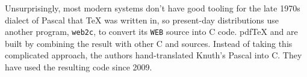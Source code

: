 Unsurprisingly, most modern systems don't have good tooling for the late 1970s
dialect of Pascal that \TeX{} was written in,
so present-day distributions use another program,
\texttt{web2c}, to convert its \texttt{WEB} source into C code.
pdf\TeX{} and \XeTeX{} are built by combining the result with other C
and \cpp{} sources.
Instead of taking this complicated approach,
the \LuaTeX{} authors hand-translated Knuth's Pascal into C.
They have used the resulting code since 2009.\punckern{}

